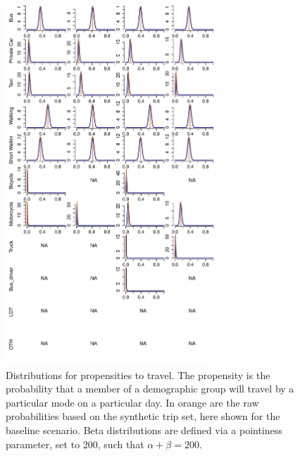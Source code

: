 \documentclass{article}
\begin{document}
\begin{appendix}
\begin{figure}[H]
\centering
\includegraphics[width=0.7\textwidth]{propensity_to_travel_200.pdf}
\caption{\small Distributions for propensities to travel. The propensity is the probability that a member of a demographic group will travel by a particular mode on a particular day. In orange are the raw probabilities based on the synthetic trip set, here shown for the baseline scenario. Beta distributions are defined via a pointiness parameter, set to 200, such that $\alpha+\beta=200$. }
\label{propensity_to_travel}
\end{figure}


\end{appendix}
\end{document}
